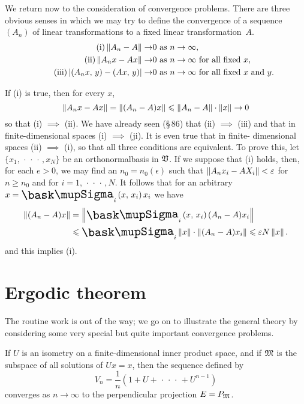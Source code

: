 We return now to the consideration of convergence problems. There are three
obvious senses in which we may try to define the convergence of a sequence
\((A_n)\) of linear transformations to a fixed linear transformation~\(A\).
\begin{align}
    \tag{i} \left\lVert A_n - A\right\rVert \to &0 \text{ as } n \to \infty,\\
    \tag{ii} \left\lVert A_n x - A x\right\rVert \to &0 \text{ as } n \to \infty \text{ for all fixed } x,\\
    \tag{iii} \left\lvert\left(A_n x,\,y\right) - \left(A x,\,y\right)\right\rvert \to &0 \text{ as } n \to \infty \text{ for all fixed } x \text{ and } y.
\end{align}

If (i) is true, then for every \(x\),
\begin{equation*}
    \left\lVert A_n x - A x\right\rVert = \left\lVert(A_n - A) x\right\rVert \leqslant \left\lVert A_n - A\right\rVert \cdot \left\lVert x\right\rVert \to 0
\end{equation*}
so that (i) \(\implies\) (ii). We have already seen (§\,86) that (ii)
\(\implies\) (iii) and that in finite-dimensional spaces (i) \(\implies\) (ji).
It is even true that in finite- dimensional spaces (ii) \(\implies\) (i), so
that all three conditions are equivalent. To prove this, let \(\{x_1,
\,\cdot\,\cdot\,\cdot\,, x_N\}\) be an orthonormalbasis in \(\mathfrak{V}\). If we
suppose that (i) holds, then, for each \(e > 0\), we may find an \(n_0 =
n_0(\epsilon)\) such that \(\left\lVert A_n x_i -A X_i\right\rVert < \varepsilon\) for \(n \geq
n_0\) and for \(i = 1, \,\cdot\,\cdot\,\cdot\,, N\). It follows that for an
arbitrary \(x = \sumx_i \innerprod{x}{x_i} x_i\) we have
\begin{align*}
    \norm{(A_n - A)x} &= \norm{\sumx_i  \innerprod{x}{x_i} (A_n - A ) x_i} \\
    &\leq \sumx_i \norm{x} \cdot \norm{(A_n - A) x_i} \leq \epsilon N \norm{x}.
\end{align*}
and this implies (i).

\section{Ergodic theorem}

The routine work is out of the way; we go on to illustrate the general theory by considering some very special but quite important convergence problems.

\begin{thmx}
    If \(U\) is an isometry on a finite-dimensional inner product space, and if
    \(\mathfrak{M}\) is the subspace of all solutions of \(Ux = x\), then the sequence
    defined by
    \begin{equation*}
        V_n = \frac{1}{n} (1 + U + \,\cdot\,\cdot\,\cdot\, + U^{n-1})
    \end{equation*}
    converges as \(n \to \infty\) to the perpendicular projection \(E =
    P_{\mathfrak{M}}\).
\end{thmx}

